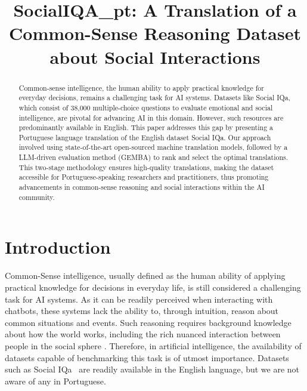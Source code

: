 \documentclass[runningheads]{llncs}
\begin{document}
\title{SocialIQA\_pt: A Translation of a Common-Sense Reasoning Dataset about Social Interactions}
\author{}

\maketitle

\begin{abstract}
   Common-sense intelligence, the human ability to apply practical knowledge for everyday decisions, remains a challenging task for AI systems. 
   Datasets like Social IQa, which consist of 38,000 multiple-choice questions to evaluate emotional and social intelligence, are pivotal for advancing AI in this domain. However, such resources are predominantly available in English.
   This paper addresses this gap by presenting a Portuguese language translation of the English dataset Social IQa. Our approach involved using state-of-the-art open-sourced machine translation models, followed by a LLM-driven evaluation method (GEMBA) to rank and select the optimal translations.
   This two-stage methodology ensures high-quality translations, making the dataset accessible for Portuguese-speaking researchers and practitioners, thus promoting advancements in common-sense reasoning and social interactions within the AI community.
\end{abstract}


\section{Introduction} 

Common-Sense intelligence, usually defined as the human ability of applying
practical knowledge for decisions in everyday life, is still considered a
challenging task for AI systems. As it can be readily perceived when interacting
with chatbots, these systems lack the ability to, through intuition, reason
about common situations and events. Such reasoning requires background knowledge
about how the world works, including the rich nuanced interaction between people
in the social sphere \cite{choi2022curious,krause2023commonsense}.
Therefore, in artificial intelligence, the availability of datasets capable of
benchmarking this task is of utmost importance. Datasets such as Social IQa~\cite{sap2019socialiqa} are readily available in the English language, but we are not aware of any in Portuguese.
\end{document}
